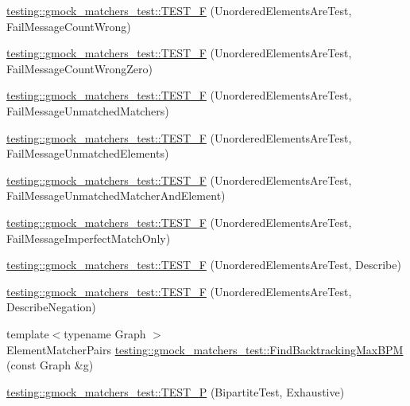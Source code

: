 \begin{DoxyCompactItemize}
\hyperlink{namespacetesting_1_1gmock__matchers__test_a5dd3b28b540c1ef01e623f840c48e7b4}{testing\+::gmock\+\_\+matchers\+\_\+test\+::\+T\+E\+S\+T\+\_\+F} (Unordered\+Elements\+Are\+Test, Fail\+Message\+Count\+Wrong)
\item 
\hyperlink{namespacetesting_1_1gmock__matchers__test_a7dc8c467fe0d6f26c0ee643be56eb590}{testing\+::gmock\+\_\+matchers\+\_\+test\+::\+T\+E\+S\+T\+\_\+F} (Unordered\+Elements\+Are\+Test, Fail\+Message\+Count\+Wrong\+Zero)
\item 
\hyperlink{namespacetesting_1_1gmock__matchers__test_a11b785087491ae58b074fa8dbbc88cd4}{testing\+::gmock\+\_\+matchers\+\_\+test\+::\+T\+E\+S\+T\+\_\+F} (Unordered\+Elements\+Are\+Test, Fail\+Message\+Unmatched\+Matchers)
\item 
\hyperlink{namespacetesting_1_1gmock__matchers__test_a6dfb50dcbb543de71fcc4d09844d36b3}{testing\+::gmock\+\_\+matchers\+\_\+test\+::\+T\+E\+S\+T\+\_\+F} (Unordered\+Elements\+Are\+Test, Fail\+Message\+Unmatched\+Elements)
\item 
\hyperlink{namespacetesting_1_1gmock__matchers__test_a2395b7e71b7ad50af72caa61c10e6898}{testing\+::gmock\+\_\+matchers\+\_\+test\+::\+T\+E\+S\+T\+\_\+F} (Unordered\+Elements\+Are\+Test, Fail\+Message\+Unmatched\+Matcher\+And\+Element)
\item 
\hyperlink{namespacetesting_1_1gmock__matchers__test_ac70f9f9717f35352349b076654094f6a}{testing\+::gmock\+\_\+matchers\+\_\+test\+::\+T\+E\+S\+T\+\_\+F} (Unordered\+Elements\+Are\+Test, Fail\+Message\+Imperfect\+Match\+Only)
\item 
\hyperlink{namespacetesting_1_1gmock__matchers__test_a937f4d835023cd6322eb7d32596f3f43}{testing\+::gmock\+\_\+matchers\+\_\+test\+::\+T\+E\+S\+T\+\_\+F} (Unordered\+Elements\+Are\+Test, Describe)
\item 
\hyperlink{namespacetesting_1_1gmock__matchers__test_a3c4c92b68a08c5d541e46ed367e216ab}{testing\+::gmock\+\_\+matchers\+\_\+test\+::\+T\+E\+S\+T\+\_\+F} (Unordered\+Elements\+Are\+Test, Describe\+Negation)
\item 
{\footnotesize template$<$typename Graph $>$ }\\Element\+Matcher\+Pairs \hyperlink{namespacetesting_1_1gmock__matchers__test_a09321a8d4a4c40ab1e369fbdf92b0414}{testing\+::gmock\+\_\+matchers\+\_\+test\+::\+Find\+Backtracking\+Max\+B\+PM} (const Graph \&g)
\item 
\hyperlink{namespacetesting_1_1gmock__matchers__test_a20589d957fcfe5399e249084dbc23e82}{testing\+::gmock\+\_\+matchers\+\_\+test\+::\+T\+E\+S\+T\+\_\+P} (Bipartite\+Test, Exhaustive)

\end{DoxyCompactItemize}
